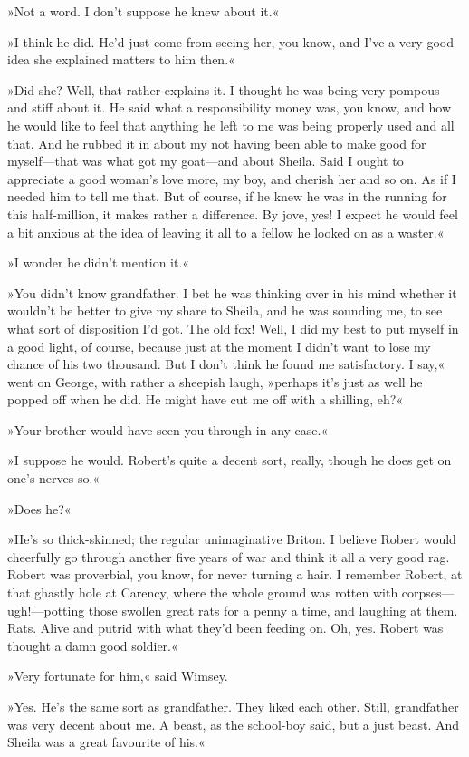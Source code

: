 »Not a word. I don't suppose he knew about it.«

»I think he did. He'd just come from seeing her, you know, and I've a very good idea she explained matters to him then.«

»Did she? Well, that rather explains it. I thought he was being very pompous and stiff about it. He said what a responsibility money was, you know, and how he would like to feel that anything he left to me was being properly used and all that. And he rubbed it in about my not having been able to make good for myself—that was what got my goat—and about Sheila. Said I ought to appreciate a good woman's love more, my boy, and cherish her and so on. As if I needed him to tell me that. But of course, if he knew he was in the running for this half-million, it makes rather a difference. By jove, yes! I expect he would feel a bit anxious at the idea of leaving it all to a fellow he looked on as a waster.«

»I wonder he didn't mention it.«

»You didn't know grandfather. I bet he was thinking over in his mind whether it wouldn't be better to give my share to Sheila, and he was sounding me, to see what sort of disposition I'd got. The old fox! Well, I did my best to put myself in a good light, of course, because just at the moment I didn't want to lose my chance of his two thousand. But I don't think he found me satisfactory. I say,« went on George, with rather a sheepish laugh, »perhaps it's just as well he popped off when he did. He might have cut me off with a shilling, eh?«

»Your brother would have seen you through in any case.«

»I suppose he would. Robert's quite a decent sort, really, though he does get on one's nerves so.«

»Does he?«

»He's so thick-skinned; the regular unimaginative Briton. I believe Robert would cheerfully go through another five years of war and think it all a very good rag. Robert was proverbial, you know, for never turning a hair. I remember Robert, at that ghastly hole at Carency, where the whole ground was rotten with corpses—ugh!—potting those swollen great rats for a penny a time, and laughing at them. Rats. Alive and putrid with what they'd been feeding on. Oh, yes. Robert was thought a damn good soldier.«

»Very fortunate for him,« said Wimsey.

»Yes. He's the same sort as grandfather. They liked each other. Still, grandfather was very decent about me. A beast, as the school-boy said, but a just beast. And Sheila was a great favourite of his.«

